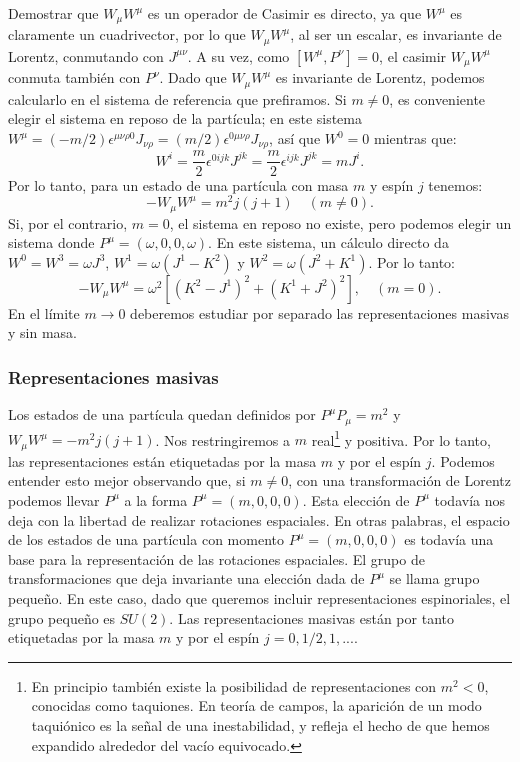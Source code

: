 \documentclass[a4paper,11pt]{book} %
\begin{document}
Demostrar que $W_{\mu}W^{\mu}$ es un operador de Casimir es directo, ya que $W^{\mu}$ es claramente un cuadrivector, por lo que $W_{\mu}W^{\mu}$, al ser un escalar, es invariante de Lorentz, conmutando con $J^{\mu\nu}$. A su vez, como $[W^{\mu},P^{\nu}]=0$, el casimir $W_{\mu}W^{\mu}$ conmuta también con $P^{\nu}$.
\medskip\newline
Dado que $W_{\mu}W^{\mu}$ es invariante de Lorentz, podemos calcularlo en el sistema de referencia que prefiramos. Si $m\ne0$, es conveniente elegir el sistema en reposo de la partícula; en este sistema $W^{\mu}=(-m/2)\epsilon^{\mu\nu\rho0}J_{\nu\rho}=(m/2)\epsilon^{0\mu\nu\rho}J_{\nu\rho}$, así que $W^{0}=0$ mientras que:
\begin{equation}
W^{i}=\frac{m}{2}\epsilon^{0ijk}J^{jk}=\frac{m}{2}\epsilon^{ijk}J^{jk}=mJ^{i}.
\end{equation} 
\noindent
Por lo tanto, para un estado de una partícula con masa $m$ y espín $j$ tenemos:
\begin{equation}
-W_{\mu}W^{\mu}=m^{2}j(j+1) \quad (m\ne0).
\end{equation}
\noindent
Si, por el contrario, $m=0$, el sistema en reposo no existe, pero podemos elegir un sistema donde $P^{\mu}=(\omega,0,0,\omega)$. En este sistema, un cálculo directo da $W^{0}=W^{3}=\omega J^{3}$, $W^{1}=\omega(J^{1}-K^{2})$ y $W^{2}=\omega(J^{2}+K^{1})$. Por lo tanto:
\begin{equation}
-W_{\mu}W^{\mu}=\omega^{2}[(K^{2}-J^{1})^{2}+(K^{1}+J^{2})^{2}], \quad (m=0).
\end{equation}
\noindent
En el límite $m\rightarrow0$ deberemos estudiar por separado las representaciones masivas y sin masa.
\subsubsection{Representaciones masivas} 
\noindent
Los estados de una partícula quedan definidos por $P^{\mu}P_{\mu}=m^{2}$ y $W_{\mu}W^{\mu}=-m^{2}j(j+1)$. Nos restringiremos a $m$ real\footnote{En principio también existe la posibilidad de representaciones con $m^{2}<0$, conocidas como taquiones. En teoría de campos, la aparición de un modo taquiónico es la señal de una inestabilidad, y refleja el hecho de que hemos expandido alrededor del vacío equivocado.} y positiva. Por lo tanto, las representaciones están etiquetadas por la masa $m$ y por el espín $j$. 
\medskip\newline
Podemos entender esto mejor observando que, si $m\ne0$, con una transformación de Lorentz podemos llevar $P^{\mu}$ a la forma $P^{\mu}=(m,0,0,0)$. Esta elección de $P^{\mu}$ todavía nos deja con la libertad de realizar rotaciones espaciales. En otras palabras, el espacio de los estados de una partícula con momento $P^{\mu}=(m,0,0,0)$ es todavía una base para la representación de las rotaciones espaciales. El grupo de transformaciones que deja invariante una elección dada de $P^{\mu}$ se llama grupo pequeño. En este caso, dado que queremos incluir representaciones espinoriales, el grupo pequeño es $SU(2)$. Las representaciones masivas están por tanto etiquetadas por la masa $m$ y por el espín $j=0,1/2,1,...$.
\end{document}
